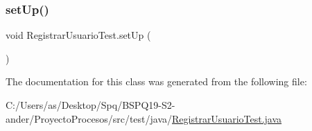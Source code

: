 \mbox{\label{class_registrar_usuario_test_a9ca8f19c0a72efcfb1e8dd2423a4c7f8}} 
\subsubsection{\texorpdfstring{setUp()}{setUp()}}
{\footnotesize\ttfamily void Registrar\+Usuario\+Test.\+set\+Up (\begin{DoxyParamCaption}{ }\end{DoxyParamCaption})}



The documentation for this class was generated from the following file\+:\begin{DoxyCompactItemize}
\item 
C\+:/\+Users/as/\+Desktop/\+Spq/\+B\+S\+P\+Q19-\/\+S2-\/ander/\+Proyecto\+Procesos/src/test/java/\mbox{\hyperlink{_registrar_usuario_test_8java}{Registrar\+Usuario\+Test.\+java}}\end{DoxyCompactItemize}
